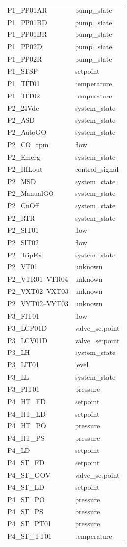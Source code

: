 \begin{longtable}{ll}
P1\_PP01AR     & pump\_state \\
P1\_PP01BD     & pump\_state \\
P1\_PP01BR     & pump\_state \\
P1\_PP02D      & pump\_state \\
P1\_PP02R      & pump\_state \\
P1\_STSP       & setpoint \\
P1\_TIT01      & temperature \\
P1\_TIT02      & temperature \\
P2\_24Vdc      & system\_state \\
P2\_ASD        & system\_state \\
P2\_AutoGO     & system\_state \\
P2\_CO\_rpm    & flow \\
P2\_Emerg      & system\_state \\
P2\_HILout     & control\_signal \\
P2\_MSD        & system\_state \\
P2\_ManualGO   & system\_state \\
P2\_OnOff      & system\_state \\
P2\_RTR        & system\_state \\
P2\_SIT01      & flow \\
P2\_SIT02      & flow \\
P2\_TripEx     & system\_state \\
P2\_VT01       & unknown \\
P2\_VTR01--VTR04 & unknown \\
P2\_VXT02--VXT03 & unknown \\
P2\_VYT02--VYT03 & unknown \\
P3\_FIT01      & flow \\
P3\_LCP01D     & valve\_setpoint \\
P3\_LCV01D     & valve\_setpoint \\
P3\_LH         & system\_state \\
P3\_LIT01      & level \\
P3\_LL         & system\_state \\
P3\_PIT01      & pressure \\
P4\_HT\_FD     & setpoint \\
P4\_HT\_LD     & setpoint \\
P4\_HT\_PO     & pressure \\
P4\_HT\_PS     & pressure \\
P4\_LD         & setpoint \\
P4\_ST\_FD     & setpoint \\
P4\_ST\_GOV    & valve\_setpoint \\
P4\_ST\_LD     & setpoint \\
P4\_ST\_PO     & pressure \\
P4\_ST\_PS     & pressure \\
P4\_ST\_PT01   & pressure \\
P4\_ST\_TT01   & temperature \\
\end{longtable}

